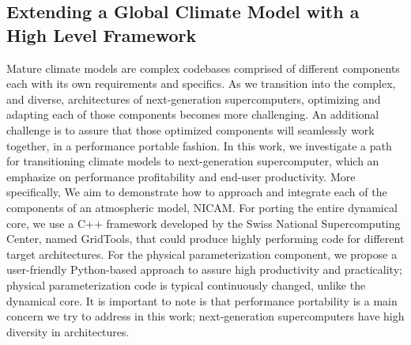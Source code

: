 \documentclass{book}
\begin{document}
\subsection{Extending a Global Climate Model with a High Level Framework}
Mature climate models are complex codebases comprised of different components each with its own requirements and specifics. As we transition into the complex, and diverse, architectures of next-generation supercomputers, optimizing and adapting each of those components becomes more challenging. An additional challenge is to assure that those optimized components will seamlessly work together, in a performance portable fashion. In this work, we investigate a path for transitioning climate models to next-generation supercomputer, which an emphasize on performance profitability and end-user productivity. More specifically, We aim to demonstrate how to approach and integrate each of the components of an atmospheric model, NICAM. For porting the entire dynamical core, we use a C++ framework developed by the Swiss National Supercomputing Center, named GridTools, that could produce highly performing code for different target architectures. For the physical parameterization component, we propose a user-friendly Python-based approach to assure high productivity and practicality; physical parameterization code is typical continuously changed, unlike the dynamical core. It is important to note is that performance portability is a main concern we try to address in this work; next-generation supercomputers have high diversity in architectures. 
\end{document}
